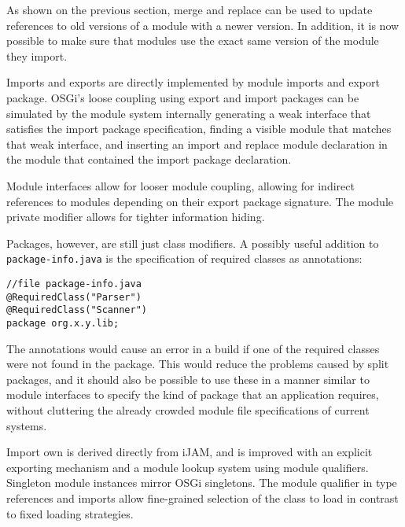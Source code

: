 As shown on the previous section, merge and replace can be used to 
update references to old versions of a module with a newer version.
In addition, it is now possible to make sure that modules use
the exact same version of the module they import.


Imports and exports are directly implemented by module imports and export package.
OSGi's loose coupling using export and import packages can be simulated by
the module system internally generating a weak interface that satisfies the import
package specification, finding a visible module that matches that weak interface, and
inserting an import and replace module declaration in the module that contained the import package
declaration.

Module interfaces allow for looser module coupling, allowing for indirect 
references to modules depending on their export package signature. The module private
modifier allows for tighter information hiding.

Packages, however, are still just class modifiers. A possibly useful addition to 
\texttt{package-info.java} is the specification of required classes as annotations:

\begin{lstlisting}
//file package-info.java
@RequiredClass("Parser")
@RequiredClass("Scanner")
package org.x.y.lib;
\end{lstlisting}

The annotations would cause an error in a build if one of the required classes were not
found in the package. This would reduce the problems caused by split packages, and it should
also be possible to use these in a manner similar to module interfaces to specify the kind
of package that an application requires, without cluttering the already crowded module
file specifications of current systems. 


Import own is derived directly from iJAM, and is improved with an explicit exporting 
mechanism and a module lookup system using module qualifiers. Singleton module instances mirror
OSGi singletons. The module qualifier in type references and
imports allow fine-grained selection of the class to load in contrast
to fixed loading strategies. 